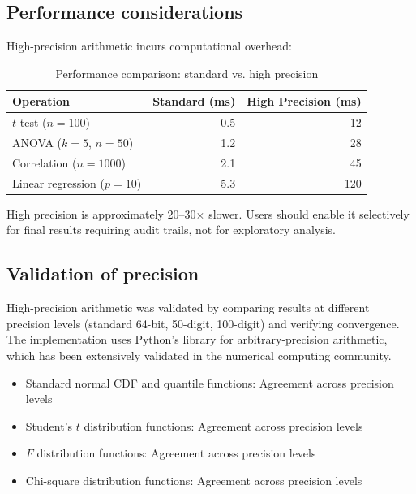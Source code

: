 \documentclass[article]{jss}
\begin{document}
\subsection{Performance considerations}

High-precision arithmetic incurs computational overhead:

\begin{table}[htbp]
\centering
\caption{Performance comparison: standard vs. high precision}
\label{tab:performance}
\begin{tabular}{lrr}
\toprule
Operation & Standard (ms) & High Precision (ms) \\
\midrule
$t$-test ($n=100$) & 0.5 & 12 \\
ANOVA ($k=5$, $n=50$) & 1.2 & 28 \\
Correlation ($n=1000$) & 2.1 & 45 \\
Linear regression ($p=10$) & 5.3 & 120 \\
\bottomrule
\end{tabular}
\end{table}

High precision is approximately 20--30$\times$ slower. Users should enable it selectively for final results requiring audit trails, not for exploratory analysis.

\subsection{Validation of precision}

High-precision arithmetic was validated by comparing results at different precision levels (standard 64-bit, 50-digit, 100-digit) and verifying convergence. The implementation uses Python's  library for arbitrary-precision arithmetic, which has been extensively validated in the numerical computing community.

\begin{itemize}
\item Standard normal CDF and quantile functions: Agreement across precision levels
\item Student's $t$ distribution functions: Agreement across precision levels
\item $F$ distribution functions: Agreement across precision levels
\item Chi-square distribution functions: Agreement across precision levels
\end{itemize}

\end{document}
